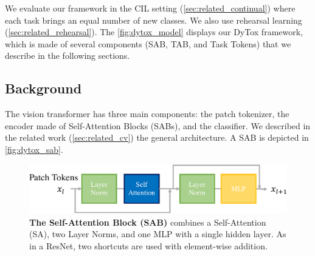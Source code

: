 \label{sec:dytox_problem}


We evaluate our framework in the \acf{CIL} setting (\autoref{sec:related_continual}) where each task
brings an equal number of new classes. We also use rehearsal learning
(\autoref{sec:related_rehearsal}). The \autoref{fig:dytox_model} displays our DyTox framework, which
is made of several components (SAB, TAB, and Task Tokens) that we describe in the following
sections.

\subsection{Background}
\label{sec:dytox_vit}

The vision transformer \citep{dosovitskiy2020vit} has three main components: the patch tokenizer, the
encoder made of Self-Attention Blocks (SABs), and the classifier. We described in the related work
(\autoref{sec:related_cv}) the general architecture. A SAB is depicted in \autoref{fig:dytox_sab}.

\begin{figure}
    \centering
    \includegraphics[width=1\textwidth]{images/dytox/sab.pdf}
    \caption{\textbf{The Self-Attention Block (SAB)} combines a Self-Attention (SA), two Layer
        Norms, and one MLP with a single hidden layer. As in a ResNet, two shortcuts are used with
        element-wise addition.}
    \label{fig:dytox_sab}
\end{figure}

